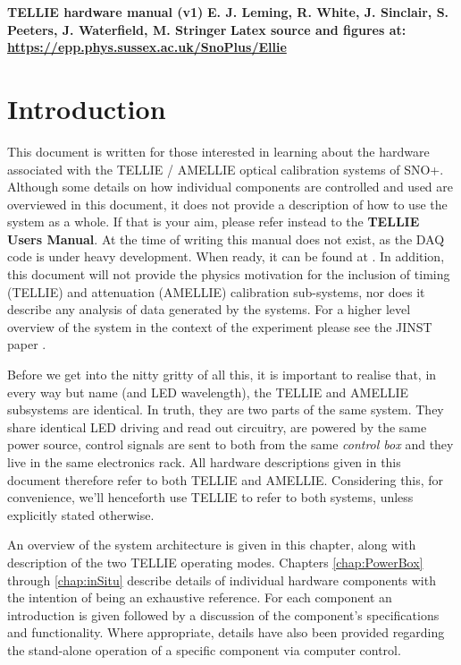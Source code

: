 \documentclass[12pt]{report}
\begin{document}
\thispagestyle{empty}
\vskip40mm
\begin{center}
	\LARGE\textbf{TELLIE hardware manual (v1)}
	\vskip5mm
	\large\textit{}
	\large\textbf{E. J. Leming, R. White, J. Sinclair, S. Peeters, J. Waterfield, M. Stringer}
	\normalsize
	\vskip25mm
	\large\textbf{Latex source and figures at: \url{https://epp.phys.sussex.ac.uk/SnoPlus/Ellie}}
	\normalsize
\end{center}
\tableofcontents
\newpage


\chapter{Introduction}
\label{sec:Intro}
This document is written for those interested in learning about the hardware associated with the TELLIE / AMELLIE optical calibration systems of SNO+. Although some details on how individual components are controlled and used are overviewed in this document, it does not provide a description of how to use the system as a whole. If that is your aim, please refer instead to the \textbf{TELLIE Users Manual}. At the time of writing this manual does not exist, as the DAQ code is under heavy development. When ready, it can be found at \cite{smellieHardwareMan}. In addition, this document will not provide the physics motivation for the inclusion of timing (TELLIE) and attenuation (AMELLIE) calibration sub-systems, nor does it describe any analysis of data generated by the systems. For a higher level overview of the system in the context of the experiment please see the JINST paper \cite{telliePaper}.

Before we get into the nitty gritty of all this, it is important to realise that, in every way but name (and LED wavelength), the TELLIE and AMELLIE subsystems are identical. In truth, they are two parts of the same system. They share identical LED driving and read out circuitry, are powered by the same power source, control signals are sent to both from the same \textit{control box} and they live in the same electronics rack. All hardware descriptions given in this document therefore refer to both TELLIE and AMELLIE. Considering this, for convenience, we'll henceforth use TELLIE to refer to both systems, unless explicitly stated otherwise.
 
An overview of the system architecture is given in this chapter, along with description of the two TELLIE operating modes. Chapters \ref{chap:PowerBox} through \ref{chap:inSitu} describe details of individual hardware components with the intention of being an exhaustive reference. For each component an introduction is given followed by a discussion of the component's specifications and functionality. Where appropriate, details have also been provided regarding the stand-alone operation of a specific component via computer control.
\end{document}
